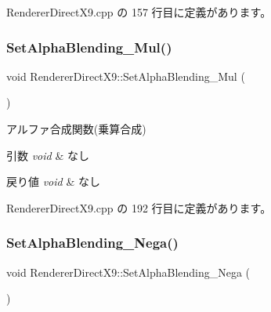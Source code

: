  Renderer\+Direct\+X9.\+cpp の 157 行目に定義があります。

\mbox{\label{class_renderer_direct_x9_a75dbeaa680610e655c6ff202591f50d7}} 
\subsubsection{\texorpdfstring{Set\+Alpha\+Blending\+\_\+\+Mul()}{SetAlphaBlending\_Mul()}}
{\footnotesize\ttfamily void Renderer\+Direct\+X9\+::\+Set\+Alpha\+Blending\+\_\+\+Mul (\begin{DoxyParamCaption}{ }\end{DoxyParamCaption})}



アルファ合成関数(乗算合成) 


\begin{DoxyParams}{引数}
{\em void} & なし \\
\hline
\end{DoxyParams}

\begin{DoxyRetVals}{戻り値}
{\em void} & なし \\
\hline
\end{DoxyRetVals}


 Renderer\+Direct\+X9.\+cpp の 192 行目に定義があります。

\mbox{\label{class_renderer_direct_x9_a5018efa829bf845405ac70beef7df947}} 
\subsubsection{\texorpdfstring{Set\+Alpha\+Blending\+\_\+\+Nega()}{SetAlphaBlending\_Nega()}}
{\footnotesize\ttfamily void Renderer\+Direct\+X9\+::\+Set\+Alpha\+Blending\+\_\+\+Nega (\begin{DoxyParamCaption}{ }\end{DoxyParamCaption})}



